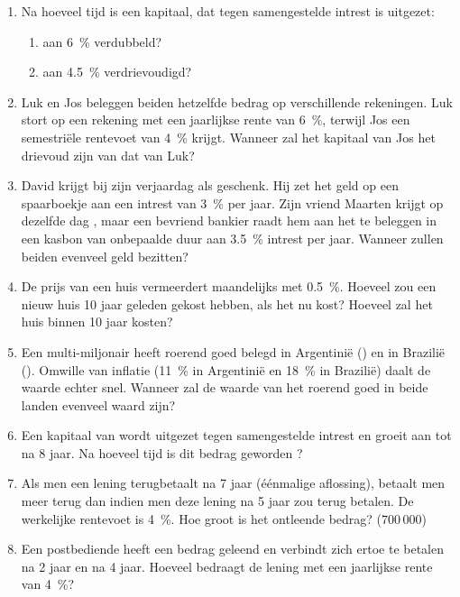 \begin{enumerate}
\begin{enumerate}
    \end{enumerate}

    \item Na hoeveel tijd is een kapitaal, dat tegen samengestelde intrest
    is uitgezet:
    \begin{enumerate}
    \item aan \SI{6}{\percent} verdubbeld?
    \item aan \SI{4,5}{\percent} verdrievoudigd?
    \end{enumerate}
    
    \item  Luk en Jos beleggen beiden hetzelfde bedrag op
    verschillende rekeningen. Luk stort op een rekening met een
    jaarlijkse rente van \SI{6}{\percent}, terwijl Jos een semestri\"{e}le
    rentevoet van \SI{4}{\percent} krijgt.
    Wanneer zal het kapitaal van Jos het drievoud zijn van dat van Luk?

    \item David krijgt bij zijn verjaardag  als
    geschenk. Hij zet het geld op een spaarboekje aan een intrest
    van \SI{3}{\percent} per jaar. Zijn vriend Maarten krijgt op dezelfde dag
    , maar een bevriend bankier raadt hem aan het te
    beleggen in een kasbon van onbepaalde duur aan \SI{3,5}{\percent} intrest
    per jaar. Wanneer zullen beiden evenveel geld bezitten?

    \item De prijs van een huis vermeerdert maandelijks met \SI{0,5}{\percent}.
    Hoeveel zou een nieuw huis 10 jaar geleden gekost hebben, als
    het nu  kost? Hoeveel zal het huis binnen 10
    jaar kosten?

    \item Een multi-miljonair heeft roerend goed belegd in
    Argentini\"e () en in Brazili\"e
    (). Omwille van inflatie (\SI{11}{\percent} in
    Argentini\"e en \SI{18}{\percent} in Brazili\"e) daalt de waarde echter snel.
    Wanneer zal de waarde van het roerend goed in beide landen 
    evenveel waard zijn?

   \item Een kapitaal van  wordt uitgezet tegen samengestelde intrest
   en groeit aan tot  na 8 jaar. Na hoeveel tijd is dit bedrag
    geworden ?

    \item Als men  een lening terugbetaalt na 7 jaar  (\'{e}\'{e}nmalige aflossing),
    betaalt men
     meer terug dan indien men deze lening na 5 jaar zou 
     terug betalen.
    De werkelijke rentevoet  is \SI{4}{\percent}. Hoe groot is het
    ontleende bedrag? ($700\,000$)

    \item Een postbediende heeft een bedrag geleend en verbindt zich ertoe
     te betalen na 2 jaar en  na 4 jaar. Hoeveel
    bedraagt de lening met een jaarlijkse rente van \SI{4}{\percent}?

    
\end{enumerate}



